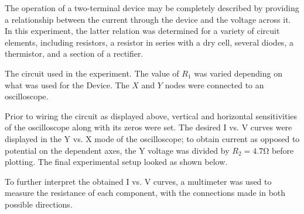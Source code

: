 \begin{paper}
	
	
	The operation of a two-terminal device may be completely described by providing a relationship between the current through the device and the voltage across it. In this experiment, the latter relation was determined for a variety of circuit elements, including resistors, a resistor in series with a dry cell, several diodes, a thermistor, and a section of a rectifier. 

	{The circuit used in the experiment.
		The value of $R_1$ was varied depending on what was used for the Device.
		The $X$ and $Y$ nodes were connected to an oscilloscope.}

	Prior to wiring the circuit as displayed above, vertical and horizontal sensitivities of the oscilloscope along with its zeros were set. The desired I vs. V curves were displayed in the Y vs. X mode of the oscilloscope; to obtain current as opposed to potential on the dependent axes, the Y voltage was divided by \( R_2 = 4.7 \si{\ohm} \) before plotting. The final experimental setup looked as shown below.
	
	
	To further interpret the obtained I vs. V curves, a multimeter was used to measure the resistance of each component, with the connections made in both possible directions. 
	

\end{paper}
